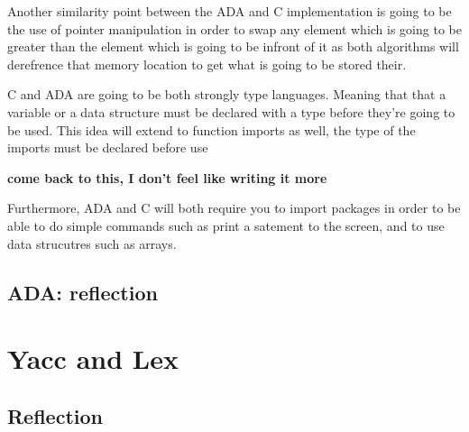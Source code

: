 \documentclass[
	12pt, %
]{fphw}
\begin{document}
Another similarity point between the ADA and C implementation is going to be the
use of pointer manipulation in order to swap any element which is going to be greater
than the element which is going to be infront of it as both algorithms will
derefrence that memory location to get what is going to be stored their.\par

C and ADA are going to be both strongly type languages. Meaning that that a variable
or a data structure must be declared with a type before they're going to be used.
This idea will extend to function imports as well, the type of the imports must be
declared before use

\textbf{come back to this, I don't feel like writing it more}

Furthermore, ADA and C will both require you to import packages in order to be able
to do simple commands such as print a satement to the screen, and to use data
strucutres such as arrays. \par

\subsection{ADA: reflection}


\section{Yacc and Lex}

\subsection{Reflection}
\end{document}
